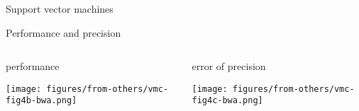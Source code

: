 \documentclass{beamer} %
\begin{document}
\begin{frame}{Support vector machines}

\end{frame}

\begin{frame}{Performance and precision}
\begin{columns}[t]
\begin{column}{0.5\textwidth}
performance

\texttt{[image: figures/from-others/vmc-fig4b-bwa.png]}
\end{column}

\begin{column}{0.5\textwidth}
error of precision

\texttt{[image: figures/from-others/vmc-fig4c-bwa.png]}
\end{column}
\end{columns}
\end{frame}
\end{document}
